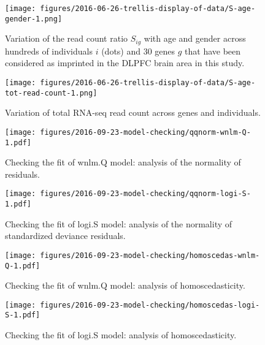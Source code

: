 \documentclass[12pt,letterpaper]{article}
\begin{document}
\begin{figure}[h]
\begin{center}
\texttt{[image: figures/2016-06-26-trellis-display-of-data/S-age-gender-1.png]}
\caption{
Variation of the read count ratio \(S_{ig}\) with age and gender across hundreds of individuals
\(i\) (dots) and 30 genes \(g\) that have been considered as imprinted in the DLPFC
brain area in this study.
}
\label{fig:S-age-gender}
\end{center}
\end{figure}

\begin{figure}[h]
\begin{center}
\texttt{[image: figures/2016-06-26-trellis-display-of-data/S-age-tot-read-count-1.png]}
\end{center}
\caption{Variation of total RNA-seq read count across genes and individuals.}
\label{fig:weight-of-evidence}
\end{figure}

\begin{figure}[h]
\begin{center}
\texttt{[image: figures/2016-09-23-model-checking/qqnorm-wnlm-Q-1.pdf]}
\end{center}
\caption{
Checking the fit of wnlm.Q model: analysis of the normality of residuals.
}
\label{fig:qqnorm-wnlm.Q}
\end{figure}

\begin{figure}[h]
\begin{center}
\texttt{[image: figures/2016-09-23-model-checking/qqnorm-logi-S-1.pdf]}
\end{center}
\caption{
Checking the fit of logi.S model: analysis of the normality of standardized deviance residuals.
}
\label{fig:qqnorm-logi.S}
\end{figure}

\begin{figure}[h]
\begin{center}
\texttt{[image: figures/2016-09-23-model-checking/homoscedas-wnlm-Q-1.pdf]}
\end{center}
\caption{
Checking the fit of wnlm.Q model: analysis of homoscedasticity.
}
\label{fig:homoscedas-wnlm.Q}
\end{figure}

\begin{figure}[h]
\begin{center}
\texttt{[image: figures/2016-09-23-model-checking/homoscedas-logi-S-1.pdf]}
\end{center}
\caption{
Checking the fit of logi.S model: analysis of homoscedasticity.
}
\label{fig:homoscedas-logi.S}
\end{figure}
\end{document}
